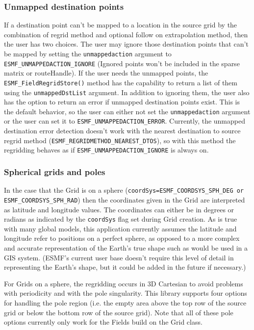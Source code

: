 \subsubsection{Unmapped destination points}
 If a destination point can't be mapped to a location in the source grid by the combination of regrid method and 
 optional follow on extrapolation method, then the user has two choices. The user may ignore those destination points
 that can't be mapped by setting the {\tt unmappedaction} argument to {\tt ESMF\_UNMAPPEDACTION\_IGNORE} (Ignored points won't be included in
 the sparse matrix or routeHandle). If the user needs the unmapped points, the {\tt ESMF\_FieldRegridStore()} method has the capability to return
 a list of them using the {\tt unmappedDstList} argument.  In addition to ignoring them, the user also has the option to return
 an error if unmapped destination points exist. This is the default behavior, so the user can either not set the {\tt unmappedaction} argument
 or the user can set it to {\tt ESMF\_UNMAPPEDACTION\_ERROR}. Currently, the unmapped destination error detection doesn't 
 work with the nearest destination to source regrid method ({\tt ESMF\_REGRIDMETHOD\_NEAREST\_DTOS}), so with this method the regridding 
 behaves as if {\tt ESMF\_UNMAPPEDACTION\_IGNORE} is always on. 


\subsubsection{Spherical grids and poles}
In the case that the Grid is on a sphere ({\tt coordSys=ESMF\_COORDSYS\_SPH\_DEG or ESMF\_COORDSYS\_SPH\_RAD})
then the coordinates given in the Grid are interpreted as latitude and longitude values. The coordinates can either be in degrees or radians as indicated by the 
{\tt coordSys} flag set during Grid creation. As is true with many global models, this application currently assumes the latitude and longitude refer to positions on a 
perfect sphere, as opposed to a more complex and accurate representation of the Earth's true shape such as would be used in a GIS system. (ESMF's current user base doesn't 
require this level of detail in representing the Earth's shape, but it could be added in the future if necessary.)

For Grids on a sphere, the regridding occurs in 3D Cartesian to avoid
problems with periodicity and with the pole singularity. This library
 supports four options for handling the pole region (i.e. the empty area above the top row of the source grid or below
 the bottom row of the source grid).  Note that all of these pole options currently only work for the Fields build on the Grid class.

